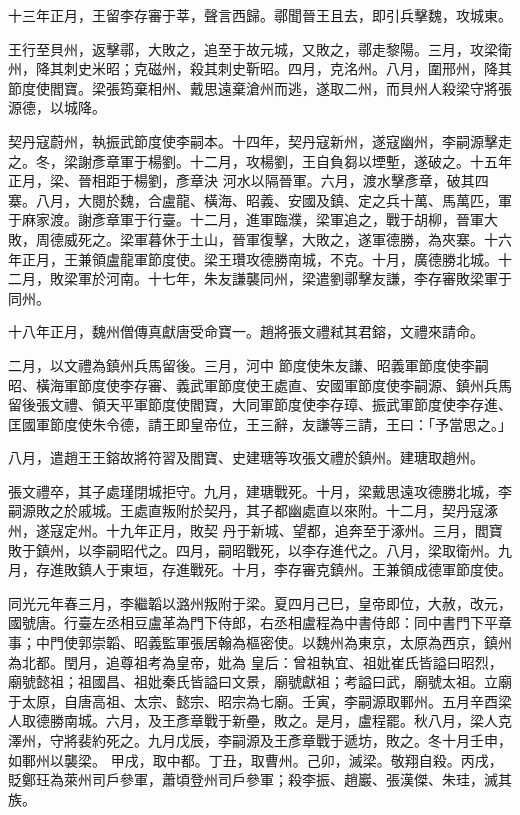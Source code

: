 \begin{pinyinscope}
 十三年正月，王留李存審于莘，聲言西歸。鄩聞晉王且去，即引兵擊魏，攻城東。



 王行至貝州，返擊鄩，大敗之，追至于故元城，又敗之，鄩走黎陽。三月，攻梁衛州，降其刺史米昭；克磁州，殺其刺史靳昭。四月，克洺州。八月，圍邢州，降其節度使閻寶。梁張筠棄相州、戴思遠棄滄州而逃，遂取二州，而貝州人殺梁守將張源德，以城降。



 契丹寇蔚州，執振武節度使李嗣本。十四年，契丹寇新州，遂寇幽州，李嗣源擊走之。冬，梁謝彥章軍于楊劉。十二月，攻楊劉，王自負芻以堙塹，遂破之。十五年正月，梁、晉相距于楊劉，彥章決
 河水以隔晉軍。六月，渡水擊彥章，破其四寨。八月，大閱於魏，合盧龍、橫海、昭義、安國及鎮、定之兵十萬、馬萬匹，軍于麻家渡。謝彥章軍于行臺。十二月，進軍臨濮，梁軍追之，戰于胡柳，晉軍大敗，周德威死之。梁軍暮休于土山，晉軍復擊，大敗之，遂軍德勝，為夾寨。十六年正月，王兼領盧龍軍節度使。梁王瓚攻德勝南城，不克。十月，廣德勝北城。十二月，敗梁軍於河南。十七年，朱友謙襲同州，梁遣劉鄩擊友謙，李存審敗梁軍于同州。



 十八年正月，魏州僧傳真獻唐受命寶一。趙將張文禮弒其君鎔，文禮來請命。



 二月，以文禮為鎮州兵馬留後。三月，河中
 節度使朱友謙、昭義軍節度使李嗣昭、橫海軍節度使李存審、義武軍節度使王處直、安國軍節度使李嗣源、鎮州兵馬留後張文禮、領天平軍節度使閻寶，大同軍節度使李存璋、振武軍節度使李存進、匡國軍節度使朱令德，請王即皇帝位，王三辭，友謙等三請，王曰：「予當思之。」



 八月，遣趙王王鎔故將符習及閻寶、史建瑭等攻張文禮於鎮州。建瑭取趙州。



 張文禮卒，其子處瑾閉城拒守。九月，建瑭戰死。十月，梁戴思遠攻德勝北城，李嗣源敗之於戚城。王處直叛附於契丹，其子都幽處直以來附。十二月，契丹寇涿州，遂寇定州。十九年正月，敗契
 丹于新城、望都，追奔至于涿州。三月，閻寶敗于鎮州，以李嗣昭代之。四月，嗣昭戰死，以李存進代之。八月，梁取衛州。九月，存進敗鎮人于東垣，存進戰死。十月，李存審克鎮州。王兼領成德軍節度使。



 同光元年春三月，李繼韜以潞州叛附于梁。夏四月己巳，皇帝即位，大赦，改元，國號唐。行臺左丞相豆盧革為門下侍郎，右丞相盧程為中書侍郎：同中書門下平章事；中門使郭崇韜、昭義監軍張居翰為樞密使。以魏州為東京，太原為西京，鎮州為北都。閏月，追尊祖考為皇帝，妣為
 皇后：曾祖執宜、祖妣崔氏皆謚曰昭烈，廟號懿祖；祖國昌、祖妣秦氏皆謚曰文景，廟號獻祖；考謚曰武，廟號太祖。立廟于太原，自唐高祖、太宗、懿宗、昭宗為七廟。壬寅，李嗣源取鄆州。五月辛酉梁人取德勝南城。六月，及王彥章戰于新壘，敗之。是月，盧程罷。秋八月，梁人克澤州，守將裴約死之。九月戊辰，李嗣源及王彥章戰于遞坊，敗之。冬十月壬申，如鄆州以襲梁。
 甲戌，取中都。丁丑，取曹州。己卯，滅梁。敬翔自殺。丙戌，貶鄭玨為萊州司戶參軍，蕭頃登州司戶參軍；殺李振、趙巖、張漢傑、朱珪，滅其族。




\end{pinyinscope}
